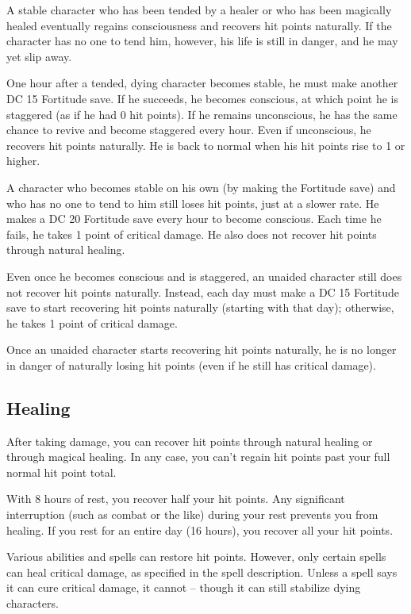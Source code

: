 A stable character who has been tended by a healer or who has been magically healed eventually regains consciousness and recovers hit points naturally. If the character has no one to tend him, however, his life is still in danger, and he may yet slip away.

 One hour after a tended, dying character
becomes stable, he must make another DC 15 Fortitude save. If he succeeds, he becomes conscious, at which point he is staggered (as if he had 0 hit points). If he remains unconscious, he has the same chance to revive and become staggered every hour. Even if unconscious, he recovers hit points naturally. He is back to normal when his hit points rise to 1 or higher.

 A character who becomes stable on his own (by making the Fortitude save) and who has no one to tend to him still loses hit points, just at a slower rate. He makes a DC 20 Fortitude save every hour to become conscious. Each time he fails, he takes 1 point of critical damage. He also does not recover hit points through natural healing.

Even once he becomes conscious and is staggered, an unaided character still does not recover hit points naturally. Instead, each day must make a DC 15 Fortitude save to start recovering hit points naturally (starting with that day); otherwise, he takes 1 point of critical damage.

Once an unaided character starts recovering hit points naturally, he is no longer in danger of naturally losing hit points (even if he still has critical damage).

\subsection{Healing}
After taking damage, you can recover hit points through natural healing or through magical healing. In any case, you can't regain hit points past your full normal hit point total.

 With 8 hours of rest, you recover half your hit points. Any significant interruption (such as combat or the like) during your rest prevents you from healing. If you rest for an entire day (16 hours), you recover all your hit points.

 Various abilities and spells can restore hit points. However, only certain spells can heal critical damage, as specified in the spell description. Unless a spell says it can cure critical damage, it cannot -- though it can still stabilize dying characters.

